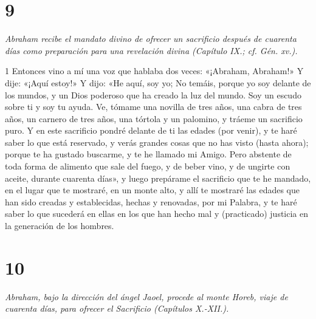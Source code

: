 \chapter{9}

\par \textit{Abraham recibe el mandato divino de ofrecer un sacrificio después de cuarenta días como preparación para una revelación divina (Capítulo IX.; cf. Gén. xv.).}

\par 1 Entonces vino a mí una voz que hablaba dos veces: «¡Abraham, Abraham!» Y dije: «¡Aquí estoy!» Y dijo: «He aquí, soy yo; No temáis, porque yo soy delante de los mundos, y un Dios poderoso que ha creado la luz del mundo. Soy un escudo sobre ti y soy tu ayuda. Ve, tómame una novilla de tres años, una cabra de tres años, un carnero de tres años, una tórtola y un palomino, y tráeme un sacrificio puro. Y en este sacrificio pondré delante de ti las edades (por venir), y te haré saber lo que está reservado, y verás grandes cosas que no has visto (hasta ahora); porque te ha gustado buscarme, y te he llamado mi Amigo. Pero abstente de toda forma de alimento que sale del fuego, y de beber vino, y de ungirte con aceite, durante cuarenta días», y luego prepárame el sacrificio que te he mandado, en el lugar que te mostraré, en un monte alto, y allí te mostraré las edades que han sido creadas y establecidas, hechas y renovadas, por mi Palabra, y te haré saber lo que sucederá en ellas en los que han hecho mal y (practicado) justicia en la generación de los hombres.

\chapter{10}

\par \textit{Abraham, bajo la dirección del ángel Jaoel, procede al monte Horeb, viaje de cuarenta días, para ofrecer el Sacrificio (Capítulos X.-XII.).}


